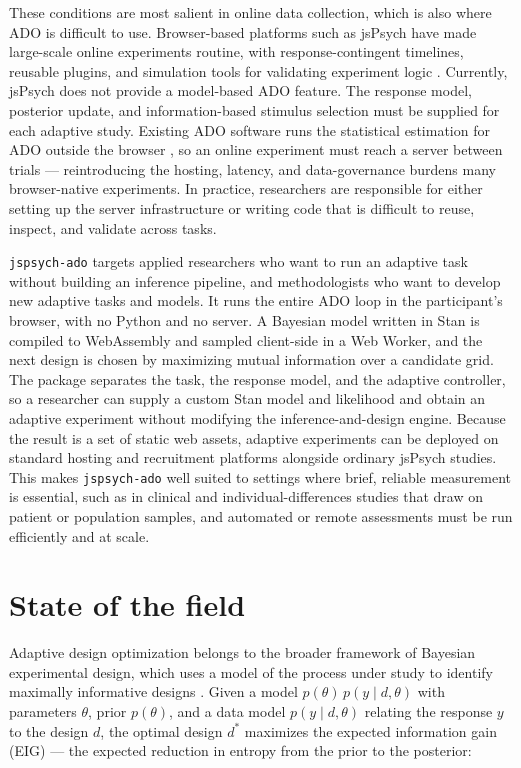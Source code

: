These conditions are most salient in online data collection, which is also where ADO is difficult to use. 
Browser-based platforms such as jsPsych have made large-scale online experiments routine, with response-contingent timelines, reusable plugins, and simulation tools for validating experiment logic \citep{deleeuw2015jspsych,deleeuw2023jspsych}. 
Currently, jsPsych does not provide a model-based ADO feature.
The response model, posterior update, and information-based stimulus selection must be supplied for each adaptive study. 
Existing ADO software runs the statistical estimation for ADO outside the browser \citep{yang2021adopy}, so an online experiment must reach a server between trials --- reintroducing the hosting, latency, and data-governance burdens many browser-native experiments.
In practice, researchers are responsible for either setting up the server infrastructure or writing code that is difficult to reuse, inspect, and validate across tasks.

\texttt{jspsych-ado} targets applied researchers who want to run an adaptive task without building an inference pipeline, and methodologists who want to develop new adaptive tasks and models.
It runs the entire ADO loop in the participant's browser, with no Python and no server.
A Bayesian model written in Stan \citep{carpenter2017stan} is compiled to WebAssembly and sampled client-side in a Web Worker, and the next design is chosen by maximizing mutual information over a candidate grid. 
The package separates the task, the response model, and the adaptive controller, so a researcher can supply a custom Stan model and likelihood and obtain an adaptive experiment without modifying the inference-and-design engine.
Because the result is a set of static web assets, adaptive experiments can be deployed on standard hosting and recruitment platforms alongside ordinary jsPsych studies.
This makes \texttt{jspsych-ado} well suited to settings where brief, reliable measurement is essential, such as in clinical and individual-differences studies that draw on patient or population samples, and automated or remote assessments must be run efficiently and at scale.

\section{State of the field}

Adaptive design optimization belongs to the broader framework of Bayesian experimental design, which uses a model of the process under study to identify maximally informative designs \citep{cavagnaro2010adaptive,rainforth2024modern,huan2024optimal}. 
Given a model $p(\theta)\,p(y \mid d, \theta)$ with parameters $\theta$, prior $p(\theta)$, and a data model $p(y \mid d, \theta)$ relating the response $y$ to the design $d$, the optimal design $d^{*}$ maximizes the expected information gain (EIG) --- the expected reduction in entropy from the prior to the posterior:


